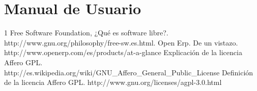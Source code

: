 \documentclass[report,spanish]{upmethodology-document}
\begin{document}
\tableofcontents

\listoffigures


\chapter{Manual de Usuario}








\begin {thebibliography}{1} 
 Free Software Foundation, ¿Qué es software libre?. http://www.gnu.org/philosophy/free-sw.es.html.
 Open Erp. De un vistazo. http://www.openerp.com/es/products/at-a-glance
 Explicación de la licencia Affero GPL. \\http://es.wikipedia.org/wiki/GNU\_Affero\_General\_Public\_License 
 Definición de la licencia Affero GPL. http://www.gnu.org/licenses/agpl-3.0.html
\end {thebibliography}
\end{document}
